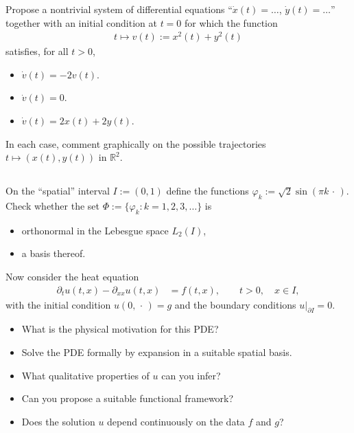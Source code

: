 \documentclass[12pt,a4paper]{article}
\begin{document}
    Propose a nontrivial system of differential equations
    ``$\dot{x}(t) = \ldots$,
    $\dot{y}(t) = \ldots$''
    together with an initial condition at $t = 0$
    for which the function
    \begin{align}
        t \mapsto v(t) := x^2(t) + y^2(t)
    \end{align}
    satisfies, for all $t > 0$,
    \begin{itemize}
    \item
        $\dot{v}(t) = -2 v(t)$.
    \item 
        $\dot{v}(t) = 0$.
    \item
        $\dot{v}(t) = 2 x(t) + 2 y(t)$.
    \end{itemize}
    In each case, 
    comment graphically on the possible trajectories $t \mapsto (x(t), y(t))$ in $\mathbb{R}^2$.

    

    \subsection{}
    
    On the ``spatial'' interval $I := (0, 1)$
    define
    the functions
    $
        \varphi_k := \sqrt{2} \sin(\pi k \,\cdot\,)
    $.
    Check whether the set
    $\Phi := \{ \varphi_k : k = 1, 2, 3, \ldots \}$
    is
    \begin{itemize}
    \item
        orthonormal
        in the Lebesgue space $L_2(I)$,
    \item
        a basis thereof.
    \end{itemize}

    Now consider the heat equation
    \begin{align}
        \partial_t u(t, x) - \partial_{x x} u(t, x)
        & =
        f(t, x),
        \qquad
        t > 0,
        \quad
        x \in I
        ,
    \end{align}
    with the initial condition $u(0, \,\cdot\,) = g$
    and the boundary conditions $u|_{\partial I} = 0$.
    
    \begin{itemize}
    \item
        What is the physical motivation for this PDE?
    \item
        Solve the PDE formally by expansion in a suitable spatial basis.
    \item
        What qualitative properties of $u$ can you infer?
    \item
        Can you propose a suitable functional framework?
    \item
        Does the solution $u$ depend continuously 
        on the data $f$ and $g$?
    \end{itemize}
\end{document}
